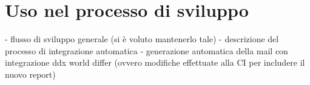 \chapter{Uso nel processo di sviluppo}

- flusso di sviluppo generale (si è voluto mantenerlo tale)
- descrizione del processo di integrazione automatica
- generazione automatica della mail con integrazione ddx world differ (ovvero modifiche effettuate alla CI per includere il nuovo report)